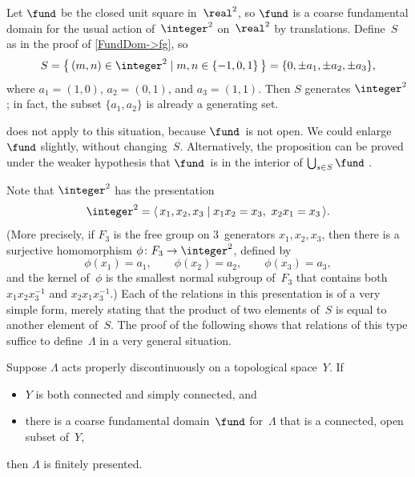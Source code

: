 
\begin{eg}
 Let $\fund$ be the closed unit square in~$\real^2$, so
$\fund$ is a coarse fundamental domain for the usual action
of~$\integer^2$ on~$\real^2$ by translations. Define~$S$
as in the proof of \cref{FundDom->fg}, so
 $$ S = \bigl\{\, (m,n) \in \integer^2 \mid m,n \in
\{-1,0,1\} \, \bigr\} 
 = \{0, \pm a_1, \pm a_2, \pm a_3 \} , $$
 where $a_1 = (1,0)$, $a_2 = (0,1)$, and $a_3 = (1,1)$.
Then $S$ generates $\integer^2$; in fact, the subset
$\{a_1,a_2\}$ is already a generating set.

 does not apply to this
situation, because $\fund$~is not open. We could enlarge
$\fund$ slightly, without changing~$S$. Alternatively, the
proposition can be proved under the weaker hypothesis that
$\fund$~is in the interior of $\bigcup_{s \in S} \fund$
.

Note that $\integer^2$ has the presentation
 $$ \integer^2 = \langle\, x_1,x_2,x_3 \mid x_1 x_2 = x_3, \ 
x_2 x_1 = x_3 \,\rangle .$$
 (More precisely, if $F_3$ is
the free group on $3$~generators $x_1,x_2,x_3$, then there
is a surjective homomorphism $\phi \colon F_3 \to
\integer^2$, defined by
 $$ \phi(x_1) = a_1, \qquad \phi(x_2) = a_2, \qquad
\phi(x_3) = a_3 ,$$
 and the kernel of~$\phi$ is the smallest normal subgroup
of~$F_3$ that contains both $x_1 x_2 x_3^{-1}$ and $x_2
x_1 x_3^{-1}$.) Each of the relations in this presentation is of a very simple form, merely stating that the product of two elements of~$S$ is equal to
another element of~$S$. The proof of the following
 shows that relations of this type suffice to
define~$\Lambda$ in a very general situation.
 \end{eg}

\begin{prop} \label{FundDom->FinPres}
 Suppose\/ $\Lambda$ acts properly discontinuously on a
topological space~$Y$. If 
	\begin{itemize}
	\item $Y$ is both connected and simply connected, 
	and 
	\item there is a coarse fundamental domain~$\fund$ for\/~$\Lambda$ that is a
connected, open subset of~$Y$, 
	\end{itemize}
then\/ $\Lambda$ is finitely presented.
 \end{prop}

